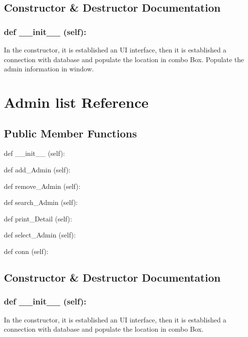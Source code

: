 \subsection{Constructor \& Destructor Documentation}
\hypertarget{class_poly_aa3def076b74bed67904976ad4f9fe9b1}{
\subsubsection[{def __init__ (self):}]{\setlength{\rightskip}{0pt plus 5cm}def {\_\_init\_\_} (self): 
}}
In the constructor, it is established an UI interface, then it is  established a connection with database and populate the location in combo Box. Populate the admin information in window.


\hypertarget{Admin_list}{\section{Admin list Reference}
\label{Admin_list}
}
\subsection*{Public Member Functions}
\begin{DoxyCompactItemize}
\item 
def {\_\_init\_\_} (self):
\item 
def {add\_Admin} (self):
\item 
def {remove\_Admin} (self):
\item 
def {search\_Admin} (self):
\item 
def {print\_Detail} (self):
\item 
def {select\_Admin} (self):
\item 
def {conn} (self):
\end{DoxyCompactItemize}

\subsection{Constructor \& Destructor Documentation}
\hypertarget{class_poly_aa3def076b74bed67904976ad4f9fe9b1}{
\subsubsection[{def __init__ (self):}]{\setlength{\rightskip}{0pt plus 5cm}def {\_\_init\_\_} (self): 
}}
In the constructor, it is established an UI interface, then it is  established a connection with database and populate the location in combo Box.
 
